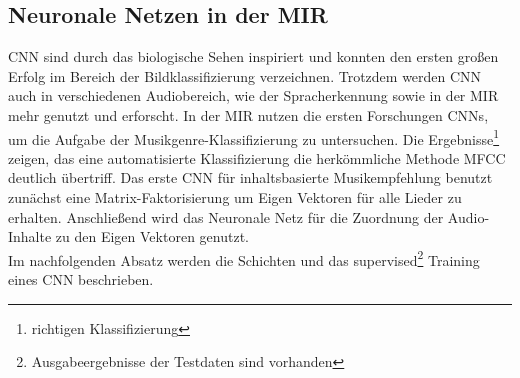 \documentclass[twosided,a4,10pt]{article}
\begin{document}
\begin{multicols}{2}
		\section{Neuronale Netzen in der MIR}
		CNN sind durch das biologische Sehen inspiriert und konnten den ersten großen Erfolg im Bereich der Bildklassifizierung \cite{alex} verzeichnen. Trotzdem werden CNN auch in verschiedenen Audiobereich, wie der Spracherkennung \cite{graves} sowie in der MIR mehr genutzt und erforscht.\newline
		In der MIR nutzen die ersten Forschungen CNNs, um die Aufgabe der Musikgenre-Klassifizierung \cite{lee} zu untersuchen. Die Ergebnisse\footnote[9]{richtigen Klassifizierung} zeigen, das eine automatisierte Klassifizierung die herkömmliche Methode MFCC deutlich übertriff. Das erste CNN für inhaltsbasierte Musikempfehlung \cite{oord} benutzt zunächst eine Matrix-Faktorisierung um Eigen Vektoren für alle Lieder zu erhalten. Anschließend wird das Neuronale Netz für die Zuordnung der Audio-Inhalte zu den Eigen Vektoren genutzt. \cite{wang}\newline\\
		Im nachfolgenden Absatz werden die Schichten und das supervised\footnote[10]{Ausgabeergebnisse der Testdaten sind vorhanden} Training eines CNN beschrieben.
		
		

\end{multicols}
\end{document}
